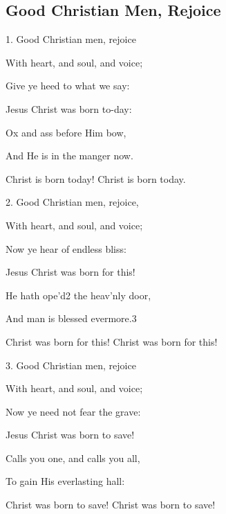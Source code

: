 \subsection{Good Christian Men, Rejoice}\label{good_christian_friends}
\begin{description}[nosep,leftmargin=\parindent,labelsep=0pt]
\item 1. Good Christian men, rejoice 
\item With heart, and soul, and voice; 
\item Give ye heed to what we say: 
\item Jesus Christ was born to-day: 
\item Ox and ass before Him bow, 
\item And He is in the manger now. 
\item Christ is born today! Christ is born today. 
\vspace{1.5ex}
\item 2. Good Christian men, rejoice, 
\item With heart, and soul, and voice; 
\item Now ye hear of endless bliss: 
\item Jesus Christ was born for this! 
\item He hath ope'd2 the heav'nly door, 
\item And man is blessed evermore.3 
\item Christ was born for this! Christ was born for this! 
\vspace{1.5ex}
\item 3. Good Christian men, rejoice 
\item With heart, and soul, and voice; 
\item Now ye need not fear the grave: 
\item Jesus Christ was born to save! 
\item Calls you one, and calls you all, 
\item To gain His everlasting hall: 
\item Christ was born to save! Christ was born to save! 
\end{description}
